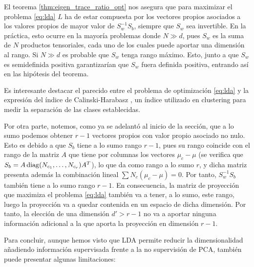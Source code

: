 El teorema \ref{thm:eigen_trace_ratio_opt} nos asegura que para maximizar el problema \ref{eq:lda} $L$ ha de estar compuesta por los vectores propios asociados a los valores propios de mayor valor de $S_w^{-1}S_b$, siempre que $S_w$ sea invertible. En la práctica, esto ocurre en la mayoría problemas donde $N \gg d$, pues $S_w$ es la suma de $N$ productos tensoriales, cada uno de los cuales puede aportar una dimensión al rango. Si $N \gg d$ es probable que $S_w$ tenga rango máximo. Esto, junto a que $S_w$ es semidefinida positiva garantizarían que $S_w$ fuera definida positiva, entrando así en las hipótesis del teorema.

Es interesante destacar el parecido entre el problema de optimización \ref{eq:lda} y la expresión del índice de Calinski-Harabasz \cite{maulik2002performance}, un índice utilizado en clustering para medir la separación de las clases establecidas.

Por otra parte, notemos, como ya se adelantó al inicio de la sección, que a lo sumo podemos obtener $r-1$ vectores propios con valor propio asociado no nulo. Esto es debido a que $S_b$ tiene a lo sumo rango $r-1$, pues su rango coincide con el rango de la matriz $A$ que tiene por columnas los vectores $\mu_c - \mu$ (se verifica que $S_b = A \operatorname{diag}(N_{c_1},\dots,N_{c_r}) A^T$), lo que da como rango a lo sumo $r$, y dicha matriz presenta además la combinación lineal $\sum N_c(\mu_c- \mu) = 0$. Por tanto, $S_w^{-1}S_b$ también tiene a lo sumo rango $r-1$. En consecuencia, la matriz de proyección que maximiza el problema \ref{eq:lda} también va a tener, a lo sumo, este rango, luego la proyección va a quedar contenida en un espacio de dicha dimensión. Por tanto, la elección de una dimensión $d' > r-1$ no va a aportar ninguna información adicional a la que aporta la proyección en dimensión $r-1$.

Para concluir, aunque hemos visto que LDA permite reducir la dimensionalidad añadiendo información supervisada frente a la no supervisión de PCA, también puede presentar algunas limitaciones:

